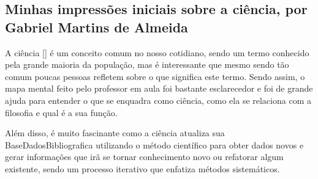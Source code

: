 \subsection{Minhas impressões iniciais sobre a ciência, por Gabriel Martins de Almeida}

 A ciência [\citet{wikipedia_ciencia_2022}] é um conceito comum no nosso cotidiano, sendo um termo conhecido pela grande maioria da população, mas é interessante que mesmo sendo tão comum poucas pessoas refletem sobre o que significa este termo. Sendo assim, o mapa mental feito pelo professor em aula foi bastante esclarecedor e foi de grande ajuda para entender o que se enquadra como ciência, como ela se relaciona com a filosofia e qual é a sua função. 
 
 Além disso, é muito fascinante como a ciência atualiza sua \gls{BaseDadosBibliografica} utilizando o método científico para obter dados novos e gerar informações que irã se tornar conhecimento novo ou refatorar algum existente, sendo um processo iterativo que enfatiza métodos sistemáticos.